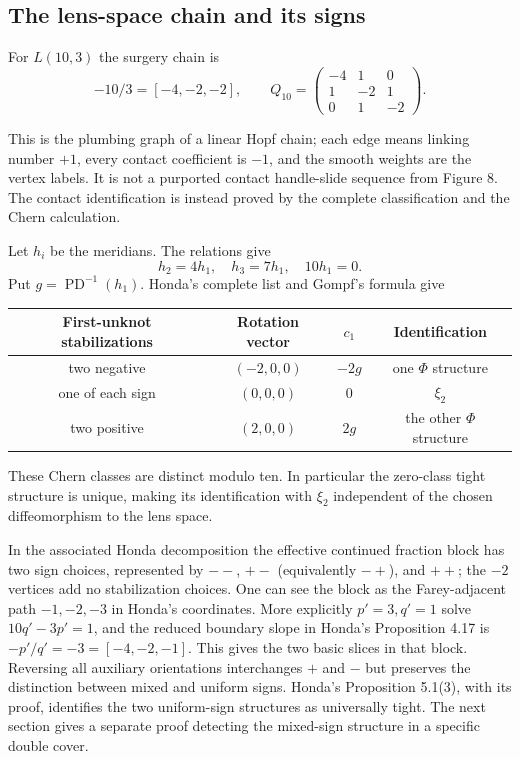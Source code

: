\documentclass[12pt]{amsart}
\theoremstyle{definition}
\theoremstyle{remark}
\numberwithin{equation}{section}
\theoremstyle{definition}
\begin{document}
\subsection{The lens-space chain and its signs}
For $L(10,3)$ the surgery chain is
\[
-10/3=[-4,-2,-2],\qquad
Q_{10}=\begin{pmatrix}-4&1&0\\1&-2&1\\0&1&-2\end{pmatrix}.
\]
\begin{center}
\end{center}
This is the plumbing graph of a linear Hopf chain; each edge means linking number $+1$, every contact coefficient is $-1$, and the smooth weights are the vertex labels. It is not a purported contact handle-slide sequence from Figure 8. The contact identification is instead proved by the complete classification and the Chern calculation.

Let $h_i$ be the meridians. The relations give
\[
h_2=4h_1,\quad h_3=7h_1,\quad10h_1=0.
\]
Put $g=\operatorname{PD}^{-1}(h_1)$. Honda's complete list and Gompf's formula give
\begin{center}
\begin{tabular}{cccc}\toprule
First-unknot stabilizations & Rotation vector & $c_1$ & Identification\\\midrule
two negative & $(-2,0,0)$ & $-2g$ & one $\Phi$ structure\\
one of each sign & $(0,0,0)$ & $0$ & $\xi_2$\\
two positive & $(2,0,0)$ & $2g$ & the other $\Phi$ structure\\\bottomrule
\end{tabular}
\end{center}
These Chern classes are distinct modulo ten. In particular the zero-class tight structure is unique, making its identification with $\xi_2$ independent of the chosen diffeomorphism to the lens space.

In the associated Honda decomposition the effective continued fraction block has two sign choices, represented by $--$, $+-$ (equivalently $-+$), and $++$; the $-2$ vertices add no stabilization choices. One can see the block as the Farey-adjacent path $-1,-2,-3$ in Honda's coordinates. More explicitly $p'=3,q'=1$ solve $10q'-3p'=1$, and the reduced boundary slope in Honda's Proposition 4.17 is $-p'/q'=-3=[-4,-2,-1]$. This gives the two basic slices in that block. Reversing all auxiliary orientations interchanges $+$ and $-$ but preserves the distinction between mixed and uniform signs. Honda's Proposition 5.1(3), with its proof, identifies the two uniform-sign structures as universally tight. The next section gives a separate proof detecting the mixed-sign structure in a specific double cover.
\end{document}
